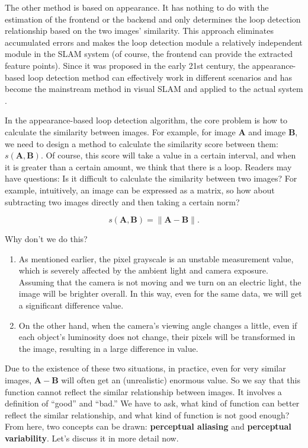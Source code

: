 The other method is based on appearance. It has nothing to do with the estimation of the frontend or the backend and only determines the loop detection relationship based on the two images' similarity. This approach eliminates accumulated errors and makes the loop detection module a relatively independent module in the SLAM system (of course, the frontend can provide the extracted feature points). Since it was proposed in the early 21st century, the appearance-based loop detection method can effectively work in different scenarios and has become the mainstream method in visual SLAM and applied to the actual system {\cite{Ulrich2000, Latif2013, Mur-Artal2015}}.

In the appearance-based loop detection algorithm, the core problem is how to calculate the similarity between images. For example, for image $\mathbf{A}$ and image $\mathbf{B}$, we need to design a method to calculate the similarity score between them: $s(\mathbf{A}, \mathbf{B })$. Of course, this score will take a value in a certain interval, and when it is greater than a certain amount, we think that there is a loop. Readers may have questions: Is it difficult to calculate the similarity between two images? For example, intuitively, an image can be expressed as a matrix, so how about subtracting two images directly and then taking a certain norm?

\begin{equation}
	s(\mathbf{A}, \mathbf{B}) = \| \mathbf{A}-\mathbf{B} \|.
\end{equation}

Why don't we do this?

\begin{enumerate}
	\item As mentioned earlier, the pixel grayscale is an unstable measurement value, which is severely affected by the ambient light and camera exposure. Assuming that the camera is not moving and we turn on an electric light, the image will be brighter overall. In this way, even for the same data, we will get a significant difference value.
	\item On the other hand, when the camera's viewing angle changes a little, even if each object's luminosity does not change, their pixels will be transformed in the image, resulting in a large difference in value.
\end{enumerate}

Due to the existence of these two situations, in practice, even for very similar images, $\mathbf{A}-\mathbf{B}$ will often get an (unrealistic) enormous value. So we say that this function {cannot reflect the similar relationship between images}. It involves a definition of ``good'' and ``bad.'' We have to ask, what kind of function can better reflect the similar relationship, and what kind of function is not good enough? From here, two concepts can be drawn: \textbf{perceptual aliasing} and \textbf{perceptual variability}. Let's discuss it in more detail now.

